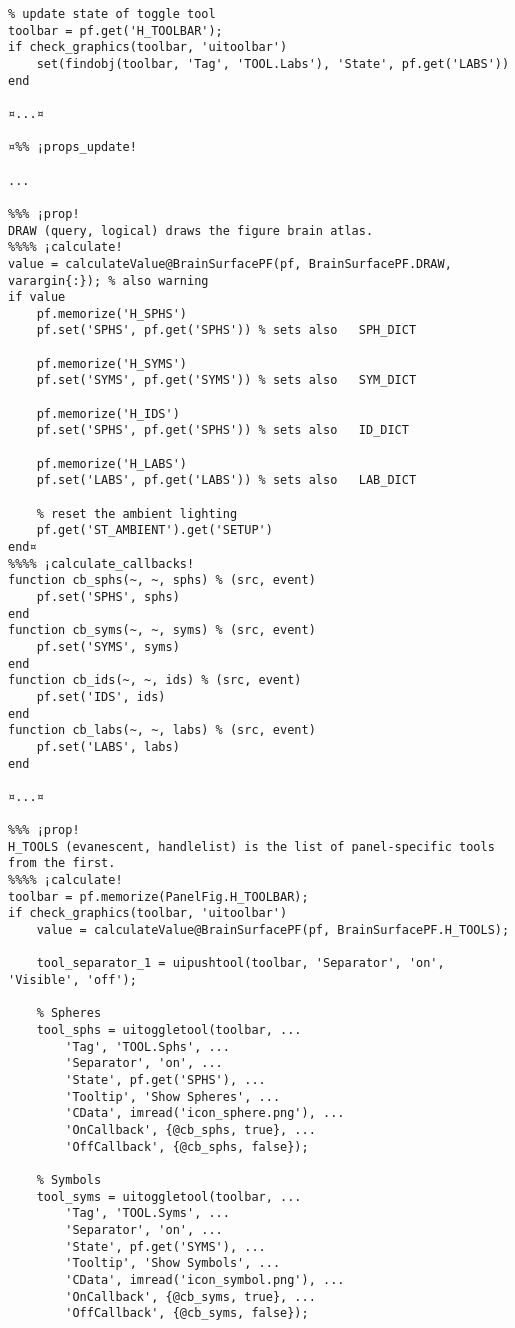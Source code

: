 \documentclass{tufte-handout}
\begin{document}
\begin{lstlisting}
% update state of toggle tool
toolbar = pf.get('H_TOOLBAR');
if check_graphics(toolbar, 'uitoolbar')
    set(findobj(toolbar, 'Tag', 'TOOL.Labs'), 'State', pf.get('LABS'))
end

¤...¤

¤%% ¡props_update!

...

%%% ¡prop!
DRAW (query, logical) draws the figure brain atlas.
%%%% ¡calculate!
value = calculateValue@BrainSurfacePF(pf, BrainSurfacePF.DRAW, varargin{:}); % also warning
if value
    pf.memorize('H_SPHS')
    pf.set('SPHS', pf.get('SPHS')) % sets also   SPH_DICT  

    pf.memorize('H_SYMS')
    pf.set('SYMS', pf.get('SYMS')) % sets also   SYM_DICT  

    pf.memorize('H_IDS')
    pf.set('SPHS', pf.get('SPHS')) % sets also   ID_DICT  

    pf.memorize('H_LABS')
    pf.set('LABS', pf.get('LABS')) % sets also   LAB_DICT  

    % reset the ambient lighting
    pf.get('ST_AMBIENT').get('SETUP')
end¤
%%%% ¡calculate_callbacks!
function cb_sphs(~, ~, sphs) % (src, event)
    pf.set('SPHS', sphs)
end
function cb_syms(~, ~, syms) % (src, event)
    pf.set('SYMS', syms)
end
function cb_ids(~, ~, ids) % (src, event)
    pf.set('IDS', ids)
end
function cb_labs(~, ~, labs) % (src, event)
    pf.set('LABS', labs)
end

¤...¤

%%% ¡prop!
H_TOOLS (evanescent, handlelist) is the list of panel-specific tools from the first.
%%%% ¡calculate!
toolbar = pf.memorize(PanelFig.H_TOOLBAR);
if check_graphics(toolbar, 'uitoolbar')
	value = calculateValue@BrainSurfacePF(pf, BrainSurfacePF.H_TOOLS);
    
    tool_separator_1 = uipushtool(toolbar, 'Separator', 'on', 'Visible', 'off');

    % Spheres
    tool_sphs = uitoggletool(toolbar, ...
        'Tag', 'TOOL.Sphs', ...
        'Separator', 'on', ...
        'State', pf.get('SPHS'), ...
        'Tooltip', 'Show Spheres', ...
        'CData', imread('icon_sphere.png'), ...
        'OnCallback', {@cb_sphs, true}, ...
        'OffCallback', {@cb_sphs, false});

    % Symbols
    tool_syms = uitoggletool(toolbar, ...
        'Tag', 'TOOL.Syms', ...
        'Separator', 'on', ...
        'State', pf.get('SYMS'), ...
        'Tooltip', 'Show Symbols', ...
        'CData', imread('icon_symbol.png'), ...
        'OnCallback', {@cb_syms, true}, ...
        'OffCallback', {@cb_syms, false});


\end{lstlisting}
\end{document}
